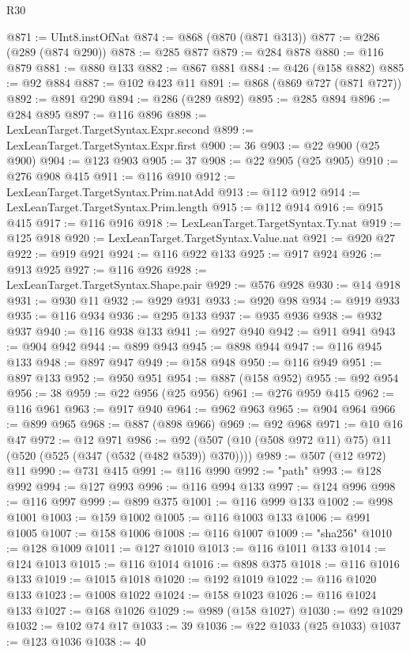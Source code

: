 \begin{lexlean}{R30}
\begin{coremodule}
@871 := UInt8.instOfNat
@874 := @868 (@870 (@871 @313))
@877 := @286 (@289 (@874 @290))
@878 := @285 @877
@879 := @284 @878
@880 := @116 @879
@881 := @880 @133
@882 := @867 @881
@884 := @426 (@158 @882)
@885 := @92 @884
@887 := @102 @423 @11
@891 := @868 (@869 @727 (@871 @727))
@892 := @891 @290
@894 := @286 (@289 @892)
@895 := @285 @894
@896 := @284 @895
@897 := @116 @896
@898 := LexLeanTarget.TargetSyntax.Expr.second
@899 := LexLeanTarget.TargetSyntax.Expr.first
@900 := 36
@903 := @22 @900 (@25 @900)
@904 := @123 @903
@905 := 37
@908 := @22 @905 (@25 @905)
@910 := @276 @908 @415
@911 := @116 @910
@912 := LexLeanTarget.TargetSyntax.Prim.natAdd
@913 := @112 @912
@914 := LexLeanTarget.TargetSyntax.Prim.length
@915 := @112 @914
@916 := @915 @415
@917 := @116 @916
@918 := LexLeanTarget.TargetSyntax.Ty.nat
@919 := @125 @918
@920 := LexLeanTarget.TargetSyntax.Value.nat
@921 := @920 @27
@922 := @919 @921
@924 := @116 @922 @133
@925 := @917 @924
@926 := @913 @925
@927 := @116 @926
@928 := LexLeanTarget.TargetSyntax.Shape.pair
@929 := @576 @928
@930 := @14 @918
@931 := @930 @11
@932 := @929 @931
@933 := @920 @98
@934 := @919 @933
@935 := @116 @934
@936 := @295 @133
@937 := @935 @936
@938 := @932 @937
@940 := @116 @938 @133
@941 := @927 @940
@942 := @911 @941
@943 := @904 @942
@944 := @899 @943
@945 := @898 @944
@947 := @116 @945 @133
@948 := @897 @947
@949 := @158 @948
@950 := @116 @949
@951 := @897 @133
@952 := @950 @951
@954 := @887 (@158 @952)
@955 := @92 @954
@956 := 38
@959 := @22 @956 (@25 @956)
@961 := @276 @959 @415
@962 := @116 @961
@963 := @917 @940
@964 := @962 @963
@965 := @904 @964
@966 := @899 @965
@968 := @887 (@898 @966)
@969 := @92 @968
@971 := @10 @16 @47
@972 := @12 @971
@986 := @92 (@507 (@10 (@508 @972 @11) @75) @11 (@520 (@525 (@347 (@532 (@482 @539)) @370))))
@989 := @507 (@12 @972) @11
@990 := @731 @415
@991 := @116 @990
@992 := "path"
@993 := @128 @992
@994 := @127 @993
@996 := @116 @994 @133
@997 := @124 @996
@998 := @116 @997
@999 := @899 @375
@1001 := @116 @999 @133
@1002 := @998 @1001
@1003 := @159 @1002
@1005 := @116 @1003 @133
@1006 := @991 @1005
@1007 := @158 @1006
@1008 := @116 @1007
@1009 := "sha256"
@1010 := @128 @1009
@1011 := @127 @1010
@1013 := @116 @1011 @133
@1014 := @124 @1013
@1015 := @116 @1014
@1016 := @898 @375
@1018 := @116 @1016 @133
@1019 := @1015 @1018
@1020 := @192 @1019
@1022 := @116 @1020 @133
@1023 := @1008 @1022
@1024 := @158 @1023
@1026 := @116 @1024 @133
@1027 := @168 @1026
@1029 := @989 (@158 @1027)
@1030 := @92 @1029
@1032 := @102 @74 @17
@1033 := 39
@1036 := @22 @1033 (@25 @1033)
@1037 := @123 @1036
@1038 := 40

\end{coremodule}
\end{lexlean}
